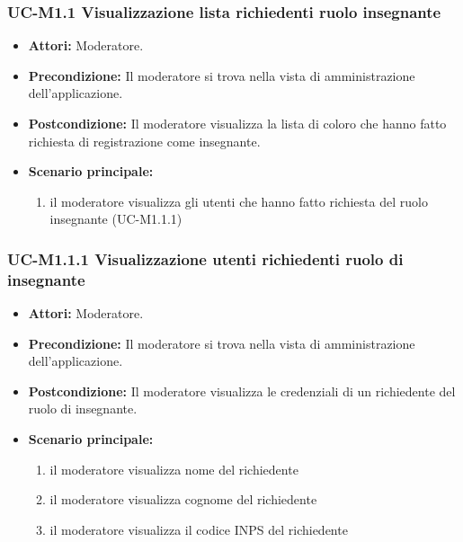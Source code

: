 \subsubsection{UC-M1.1 Visualizzazione lista richiedenti ruolo insegnante}
	\begin{itemize}
		\item \textbf{Attori:} Moderatore.
		\item \textbf{Precondizione:} Il moderatore si trova nella vista di amministrazione dell'applicazione.
		\item \textbf{Postcondizione:} Il moderatore visualizza la lista di coloro che hanno fatto richiesta di registrazione come insegnante.
		\item \textbf{Scenario principale:}
			\begin{enumerate}
				\item il moderatore visualizza gli utenti che hanno fatto richiesta del ruolo insegnante (UC-M1.1.1)
			\end{enumerate}
	\end{itemize}
		
\subsubsection{UC-M1.1.1 Visualizzazione utenti richiedenti ruolo di insegnante}
	\begin{itemize}
		\item \textbf{Attori:} Moderatore.
		\item \textbf{Precondizione:} Il moderatore si trova nella vista di amministrazione dell'applicazione.
		\item \textbf{Postcondizione:} Il moderatore visualizza le credenziali di un richiedente del ruolo di insegnante.
		\item \textbf{Scenario principale:}
			\begin{enumerate}
				\item il moderatore visualizza nome del richiedente
				\item il moderatore visualizza cognome del richiedente
				\item il moderatore visualizza il codice INPS del richiedente
			\end{enumerate}
	\end{itemize}			

